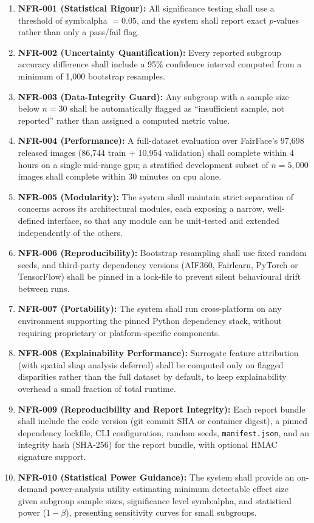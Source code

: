 \begin{enumerate}
    \item \textbf{NFR-001 (Statistical Rigour):} All significance testing shall use a threshold of \gls{symb:alpha} \(= 0.05\), and the system shall report exact \(p\)-values rather than only a pass/fail flag.
    \item \textbf{NFR-002 (Uncertainty Quantification):} Every reported subgroup accuracy difference shall include a 95\% confidence interval computed from a minimum of 1{,}000 bootstrap resamples.
    \item \textbf{NFR-003 (Data-Integrity Guard):} Any subgroup with a sample size below \(n = 30\) shall be automatically flagged as ``insufficient sample, not reported'' rather than assigned a computed metric value.
    \item \textbf{NFR-004 (Performance):} A full-dataset evaluation over FairFace's 97{,}698 released images (86{,}744 train + 10{,}954 validation) shall complete within 4 hours on a single mid-range \gls{gpu}; a stratified development subset of \(n = 5{,}000\) images shall complete within 30 minutes on \gls{cpu} alone.
    \item \textbf{NFR-005 (Modularity):} The system shall maintain strict separation of concerns across its architectural modules, each exposing a narrow, well-defined interface, so that any module can be unit-tested and extended independently of the others.
    \item \textbf{NFR-006 (Reproducibility):} Bootstrap resampling shall use fixed random seeds, and third-party dependency versions (AIF360, Fairlearn, PyTorch or TensorFlow) shall be pinned in a lock-file to prevent silent behavioural drift between runs.
    \item \textbf{NFR-007 (Portability):} The system shall run cross-platform on any environment supporting the pinned Python dependency stack, without requiring proprietary or platform-specific components.
    \item \textbf{NFR-008 (Explainability Performance):} Surrogate feature attribution (with spatial \gls{shap} analysis deferred) shall be computed only on flagged disparities rather than the full dataset by default, to keep explainability overhead a small fraction of total runtime.
    \item \textbf{NFR-009 (Reproducibility and Report Integrity):} Each report bundle shall include the code version (git commit SHA or container digest), a pinned dependency lockfile, CLI configuration, random seeds, \texttt{manifest.json}, and an integrity hash (SHA-256) for the report bundle, with optional HMAC signature support.
    \item \textbf{NFR-010 (Statistical Power Guidance):} The system shall provide an on-demand power-analysis utility estimating minimum detectable effect size given subgroup sample sizes, significance level \gls{symb:alpha}, and statistical power (\(1-\beta\)), presenting sensitivity curves for small subgroups.
\end{enumerate}

